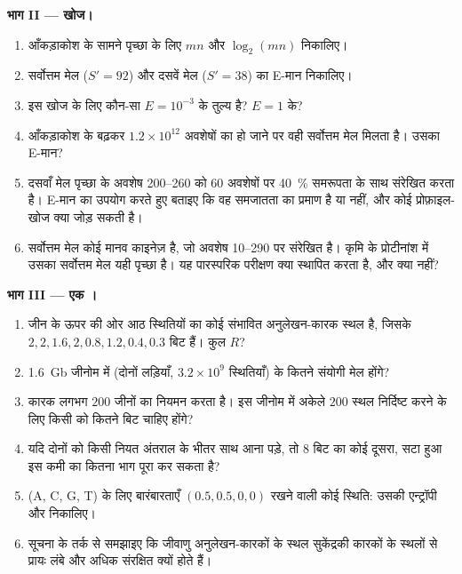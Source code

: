 \begin{problem}
\medskip
\noindent\textbf{भाग II --- खोज।}
\begin{enumerate}[resume]
  \item आँकड़ाकोश के सामने पृच्छा के लिए $mn$ और
        $\log_{2}(mn)$ निकालिए।
  \item सर्वोत्तम मेल ($S' = 92$) और दसवें मेल ($S' = 38$) का
        E-मान निकालिए।
  \item इस खोज के लिए कौन-सा  $E = 10^{-3}$ के तुल्य है?
        $E = 1$ के?
  \item आँकड़ाकोश के बढ़कर $1.2\times 10^{12}$ अवशेषों का हो जाने पर
        वही सर्वोत्तम मेल मिलता है। उसका E-मान?
  \item दसवाँ मेल पृच्छा के अवशेष 200--260 को $60$ अवशेषों पर
        \qty{40}{\%} समरूपता के साथ संरेखित करता है। E-मान का उपयोग
        करते हुए बताइए कि वह समजातता का प्रमाण है या नहीं, और कोई
        प्रोफ़ाइल-खोज क्या जोड़ सकती है।
  \item सर्वोत्तम मेल कोई मानव काइनेज़ है, जो अवशेष 10--290 पर संरेखित
        है। कृमि के प्रोटीनांश में उसका सर्वोत्तम मेल यही पृच्छा है।
        यह पारस्परिक परीक्षण क्या स्थापित करता है, और क्या नहीं?
\end{enumerate}

\medskip
\noindent\textbf{भाग III --- एक ।}
\begin{enumerate}[resume]
  \item जीन के ऊपर की ओर आठ स्थितियों का कोई संभावित अनुलेखन-कारक
        स्थल है, जिसके 
        $2, 2, 1.6, 2, 0.8, 1.2, 0.4, 0.3$ बिट हैं। कुल $R$?
  \item \qty{1.6}{Gb} जीनोम में (दोनों लड़ियाँ, $3.2\times 10^{9}$
        स्थितियाँ)  के कितने संयोगी मेल होंगे?
  \item कारक लगभग $200$ जीनों का नियमन करता है। इस जीनोम में अकेले
        $200$ स्थल निर्दिष्ट करने के लिए किसी  को कितने बिट
        चाहिए होंगे?
  \item यदि दोनों को किसी नियत अंतराल के भीतर साथ आना पड़े, तो $8$ बिट
        का कोई दूसरा, सटा हुआ  इस कमी का कितना भाग पूरा कर
        सकता है?
  \item (A, C, G, T) के लिए बारंबारताएँ $(0.5, 0.5, 0, 0)$ रखने वाली
        कोई स्थिति: उसकी एन्ट्रॉपी और  निकालिए।
  \item सूचना के तर्क से समझाइए कि जीवाणु अनुलेखन-कारकों के स्थल
        सुकेंद्रकी कारकों के स्थलों से प्रायः लंबे और अधिक संरक्षित
        क्यों होते हैं।
\end{enumerate}


\end{problem}
